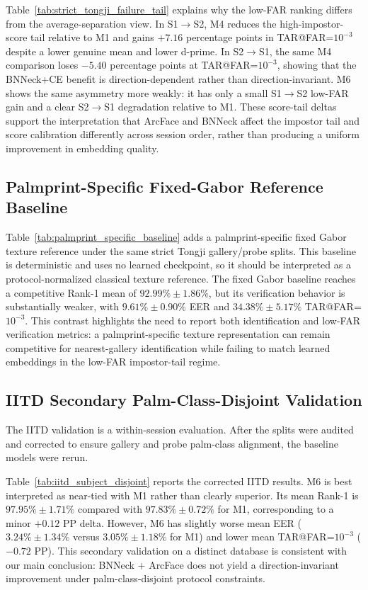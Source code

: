 Table~\ref{tab:strict_tongji_failure_tail} explains why the low-FAR ranking differs from the average-separation view. In S1$\rightarrow$S2, M4 reduces the high-impostor-score tail relative to M1 and gains $+7.16$ percentage points in TAR@FAR=$10^{-3}$ despite a lower genuine mean and lower d-prime. In S2$\rightarrow$S1, the same M4 comparison loses $-5.40$ percentage points at TAR@FAR=$10^{-3}$, showing that the BNNeck+CE benefit is direction-dependent rather than direction-invariant. M6 shows the same asymmetry more weakly: it has only a small S1$\rightarrow$S2 low-FAR gain and a clear S2$\rightarrow$S1 degradation relative to M1. These score-tail deltas support the interpretation that ArcFace and BNNeck affect the impostor tail and score calibration differently across session order, rather than producing a uniform improvement in embedding quality.

\subsection{Palmprint-Specific Fixed-Gabor Reference Baseline}



Table~\ref{tab:palmprint_specific_baseline} adds a palmprint-specific fixed Gabor texture reference under the same strict Tongji gallery/probe splits. This baseline is deterministic and uses no learned checkpoint, so it should be interpreted as a protocol-normalized classical texture reference. The fixed Gabor baseline reaches a competitive Rank-1 mean of $92.99\% \pm 1.86\%$, but its verification behavior is substantially weaker, with $9.61\% \pm 0.90\%$ EER and $34.38\% \pm 5.17\%$ TAR@FAR=$10^{-3}$. This contrast highlights the need to report both identification and low-FAR verification metrics: a palmprint-specific texture representation can remain competitive for nearest-gallery identification while failing to match learned embeddings in the low-FAR impostor-tail regime.

\subsection{IITD Secondary Palm-Class-Disjoint Validation}

The IITD validation is a within-session evaluation. After the splits were audited and corrected to ensure gallery and probe palm-class alignment, the baseline models were rerun.



Table~\ref{tab:iitd_subject_disjoint} reports the corrected IITD results. M6 is best interpreted as near-tied with M1 rather than clearly superior. Its mean Rank-1 is $97.95\% \pm 1.71\%$ compared with $97.83\% \pm 0.72\%$ for M1, corresponding to a minor $+0.12$ PP delta. However, M6 has slightly worse mean EER ($3.24\% \pm 1.34\%$ versus $3.05\% \pm 1.18\%$ for M1) and lower mean TAR@FAR=$10^{-3}$ ($-0.72$ PP). This secondary validation on a distinct database is consistent with our main conclusion: BNNeck + ArcFace does not yield a direction-invariant improvement under palm-class-disjoint protocol constraints.
